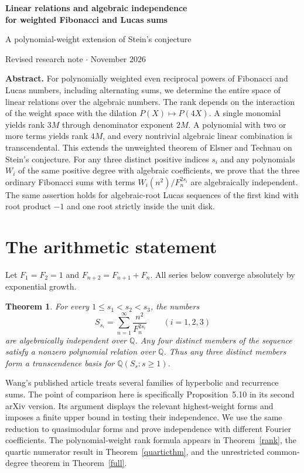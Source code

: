 \documentclass[11pt]{article}
\newtheorem{theorem}{Theorem}
\newcommand{\QQ}{\mathbb Q}
\begin{document}
\begin{center}
{\LARGE\bfseries Linear relations and algebraic independence\\[2pt] for weighted Fibonacci and Lucas sums}\par
\vspace{0.6em}
{\large A polynomial-weight extension of Stein's conjecture}\par
\vspace{0.7em}
Revised research note \quad $\cdot$  November 2026
\end{center}
\smallskip
\noindent\textbf{Abstract.}
For polynomially weighted even reciprocal powers of Fibonacci and Lucas numbers, including alternating sums, we determine the entire space of linear relations over the algebraic numbers. The rank depends on the interaction of the weight space with the dilation $P(X)\mapsto P(4X)$. A single monomial yields rank $3M$ through denominator exponent $2M$. A polynomial with two or more terms yields rank $4M$, and every nontrivial algebraic linear combination is transcendental. This extends the unweighted theorem of Elsner and Technau on Stein's conjecture. For any three distinct positive indices $s_i$ and any polynomials $W_i$ of the same positive degree with algebraic coefficients, we prove that the three ordinary Fibonacci sums with terms $W_i(n^2)/F_n^{2s_i}$ are algebraically independent. The same assertion holds for algebraic-root Lucas sequences of the first kind with root product $-1$ and one root strictly inside the unit disk.

\section{The arithmetic statement}
Let $F_1=F_2=1$ and $F_{n+2}=F_{n+1}+F_n$. All series below converge absolutely by exponential growth.
\begin{theorem}\label{main}
For every $1\le s_1<s_2<s_3$, the numbers
\[
 S_{s_i}=\sum_{n=1}^{\infty}\frac{n^2}{F_n^{2s_i}}
 \qquad (i=1,2,3)
\]
are algebraically independent over $\QQ$. Any four distinct members of the sequence satisfy a nonzero polynomial relation over $\QQ$. Thus any three distinct members form a transcendence basis for $\QQ(S_s:s\ge1)$.
\end{theorem}
Wang's published article \cite{Wang2025} treats several families of hyperbolic and recurrence sums. The point of comparison here is specifically Proposition~5.10 in its second arXiv version. Its argument displays the relevant highest-weight forms and imposes a finite upper bound in testing their independence. We use the same reduction to quasimodular forms and prove independence with different Fourier coefficients. The polynomial-weight rank formula appears in Theorem~\ref{rank}, the quartic numerator result in Theorem~\ref{quarticthm}, and the unrestricted common-degree theorem in Theorem~\ref{full}.
\end{document}
